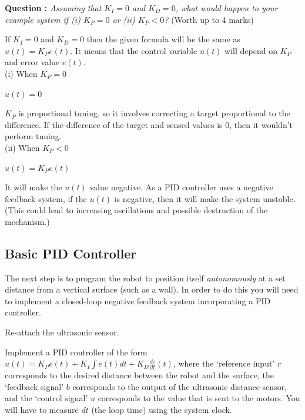 \documentclass[hidelinks,a4paper,11pt]{article}
\newcounter{question}
\newcommand\myq{\refstepcounter{question}\thequestion}
\begin{document}
	{\bfseries Question \myq:}  \emph{Assuming that $K_I=0$ and $K_D=0$, what would happen to your example system if (i) $K_P=0$ or (ii) $K_P<0$?} (Worth up to 4 marks)\\
	\begin{mdframed}
		If $K_I=0$ and $K_D=0$ then the given formula will be the same as $u(t) = K_P e(t)$. It means that the control variable $u(t)$ will depend on $K_P$ and error value $e(t)$.\\
		
		(i) When $K_P=0$
		\begin{center}$u(t)=0$\end{center}
		$K_P$ is proportional tuning, so it involves correcting a target proportional to the difference. If the difference of the target and sensed values is 0, then it wouldn't perform tuning.\\
		
		(ii) When $K_P<0$
		\begin{center}$u(t)=K_P e(t)$\end{center}
		It will make the $u(t)$ value negative. As a PID controller uses a negative feedback system, if the $u(t)$ is negative, then it will make the system unstable. (This could lead to increasing oscillations and possible destruction of the mechanism.)
	\end{mdframed}
	\vspace*{\baselineskip}
	
	
	\subsection{Basic PID Controller}
	
	The next step is to program the robot to position itself \emph{autonomously} at a set distance from a vertical surface (such as a wall).  In order to do this you will need to implement a closed-loop negative feedback system incorporating a PID controller.
	
	\begin{todolist}
		\item Re-attach the ultrasonic sensor.
		\item Implement a PID controller of the form $u(t) = K_P e(t) + K_I \int e(t)dt + K_D \frac{de}{dt}(t)$, where the `reference input' $r$ corresponds to the desired distance between the robot and the surface, the `feedback signal' $b$ corresponds to the output of the ultrasonic distance sensor, and the `control signal' $u$ corresponds to the value that is sent to the motors.  You will have to measure $dt$ (the loop time) using the system clock.
	\end{todolist}
	
\end{document}

